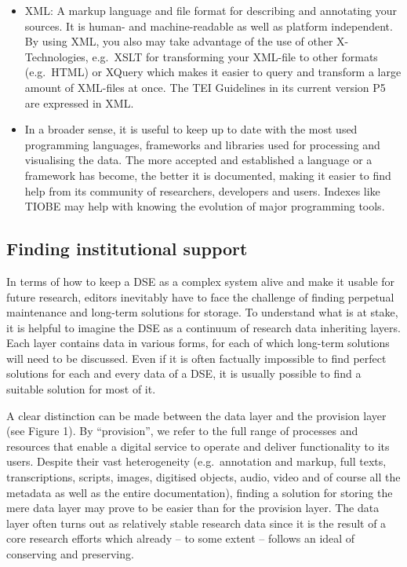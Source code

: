 \documentclass[
  letterpaper,
  DIV=11,
  numbers=noendperiod]{scrreprt}
\providecommand{\tightlist}{%
  \setlength{\itemsep}{0pt}\setlength{\parskip}{0pt}}\usepackage{longtable,booktabs,array}
\begin{document}
\begin{itemize}
\tightlist
\item
  XML: A markup language and file format for describing and annotating
  your sources. It is human- and machine-readable as well as platform
  independent. By using XML, you also may take advantage of the use of
  other X-Technologies, e.g.~XSLT for transforming your XML-file to
  other formats (e.g.~HTML) or XQuery which makes it easier to query and
  transform a large amount of XML-files at once. The TEI Guidelines in
  its current version P5 are expressed in XML.
\end{itemize}

\begin{itemize}
\tightlist
\item
  In a broader sense, it is useful to keep up to date with the most used
  programming languages, frameworks and libraries used for processing
  and visualising the data. The more accepted and established a language
  or a framework has become, the better it is documented, making it
  easier to find help from its community of researchers, developers and
  users. Indexes like TIOBE may help with knowing the evolution of major
  programming tools.
\end{itemize}

\subsection{Finding institutional
support}\label{finding-institutional-support}

In terms of how to keep a DSE as a complex system alive and make it
usable for future research, editors inevitably have to face the
challenge of finding perpetual maintenance and long-term solutions for
storage. To understand what is at stake, it is helpful to imagine the
DSE as a continuum of research data inheriting layers. Each layer
contains data in various forms, for each of which long-term solutions
will need to be discussed. Even if it is often factually impossible to
find perfect solutions for each and every data of a DSE, it is usually
possible to find a suitable solution for most of it.

A clear distinction can be made between the data layer and the provision
layer (see Figure 1). By ``provision'', we refer to the full range of
processes and resources that enable a digital service to operate and
deliver functionality to its users. Despite their vast heterogeneity
(e.g.~annotation and markup, full texts, transcriptions, scripts,
images, digitised objects, audio, video and of course all the metadata
as well as the entire documentation), finding a solution for storing the
mere data layer may prove to be easier than for the provision layer. The
data layer often turns out as relatively stable research data since it
is the result of a core research efforts which already -- to some extent
-- follows an ideal of conserving and preserving.
\end{document}
